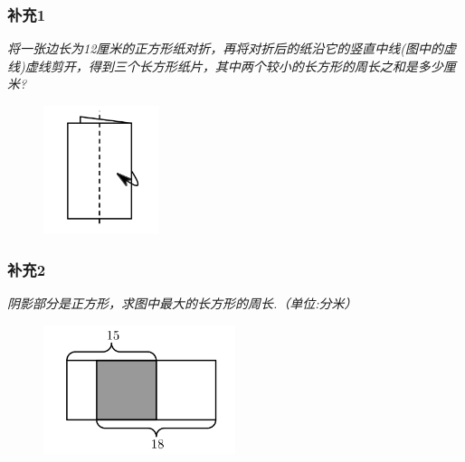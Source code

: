 \begin{frame}
    \frametitle{补充1}
    \textit{将一张边长为12厘米的正方形纸对折，再将对折后的纸沿它的竖直中线(图中的虚线)虚线剪开，得到三个长方形纸片，其中两个较小的长方形的周长之和是多少厘米?}
    \begin{figure}[H] 
        \centering
        \includegraphics[width=0.3\textwidth]{./pics/Chapter_1/buchong1.png}
    \end{figure}
\end{frame}

\begin{frame}
    \frametitle{补充2}
    \textit{阴影部分是正方形，求图中最大的长方形的周长.（单位:分米）}
    \begin{figure}[H] 
        \centering
        \includegraphics[width=0.5\textwidth]{./pics/Chapter_1/buchong2.png}
    \end{figure}
\end{frame}